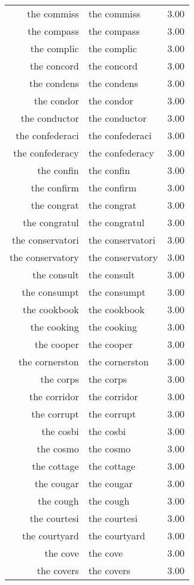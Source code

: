 \begin{table}[ht]
\begin{tabular}{rlr}
  the commiss & the commiss & 3.00 \\ 
  the compass & the compass & 3.00 \\ 
  the complic & the complic & 3.00 \\ 
  the concord & the concord & 3.00 \\ 
  the condens & the condens & 3.00 \\ 
  the condor & the condor & 3.00 \\ 
  the conductor & the conductor & 3.00 \\ 
  the confederaci & the confederaci & 3.00 \\ 
  the confederacy & the confederacy & 3.00 \\ 
  the confin & the confin & 3.00 \\ 
  the confirm & the confirm & 3.00 \\ 
  the congrat & the congrat & 3.00 \\ 
  the congratul & the congratul & 3.00 \\ 
  the conservatori & the conservatori & 3.00 \\ 
  the conservatory & the conservatory & 3.00 \\ 
  the consult & the consult & 3.00 \\ 
  the consumpt & the consumpt & 3.00 \\ 
  the cookbook & the cookbook & 3.00 \\ 
  the cooking & the cooking & 3.00 \\ 
  the cooper & the cooper & 3.00 \\ 
  the cornerston & the cornerston & 3.00 \\ 
  the corps & the corps & 3.00 \\ 
  the corridor & the corridor & 3.00 \\ 
  the corrupt & the corrupt & 3.00 \\ 
  the cosbi & the cosbi & 3.00 \\ 
  the cosmo & the cosmo & 3.00 \\ 
  the cottage & the cottage & 3.00 \\ 
  the cougar & the cougar & 3.00 \\ 
  the cough & the cough & 3.00 \\ 
  the courtesi & the courtesi & 3.00 \\ 
  the courtyard & the courtyard & 3.00 \\ 
  the cove & the cove & 3.00 \\ 
  the covers & the covers & 3.00 \\ 

\end{tabular}
\end{table}
